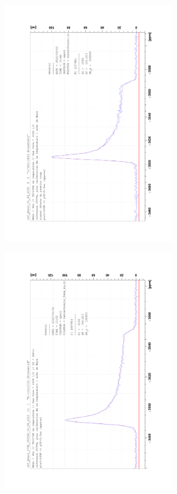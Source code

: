 \documentclass[12pt]{article}
\begin{document}
\begin{figure}[!ht]
    \centering
    \begin{subfigure}[b]{0.3\textwidth}
        \includegraphics[width=0.8\textwidth,angle=-90]{207Pb/207Pb_255K.pdf}
    \end{subfigure}
    \begin{subfigure}[b]{0.3\textwidth}
        \includegraphics[width=0.8\textwidth,angle=-90]{207Pb/207Pb_273K.pdf}

\end{subfigure}
\end{figure}
\end{document}
